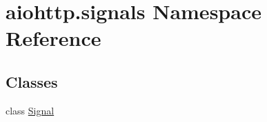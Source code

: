 \hypertarget{namespaceaiohttp_1_1signals}{}\section{aiohttp.\+signals Namespace Reference}
\label{namespaceaiohttp_1_1signals}
\subsection*{Classes}
\begin{DoxyCompactItemize}
\item 
class \hyperlink{classaiohttp_1_1signals_1_1_signal}{Signal}
\end{DoxyCompactItemize}
